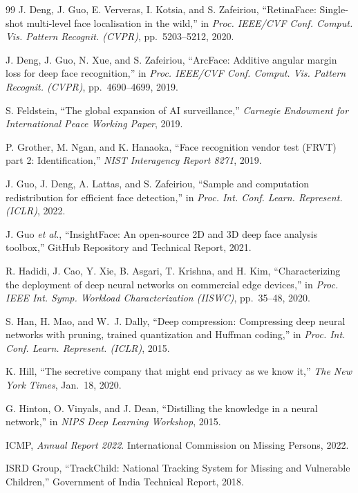 \documentclass[12pt, a4paper]{article}
\begin{document}
\begin{thebibliography}{99}
J. Deng, J. Guo, E. Ververas, I. Kotsia, and S. Zafeiriou, ``RetinaFace: Single-shot multi-level face localisation in the wild,'' in \textit{Proc. IEEE/CVF Conf. Comput. Vis. Pattern Recognit. (CVPR)}, pp.~5203--5212, 2020.

J. Deng, J. Guo, N. Xue, and S. Zafeiriou, ``ArcFace: Additive angular margin loss for deep face recognition,'' in \textit{Proc. IEEE/CVF Conf. Comput. Vis. Pattern Recognit. (CVPR)}, pp.~4690--4699, 2019.

S. Feldstein, ``The global expansion of AI surveillance,'' \textit{Carnegie Endowment for International Peace Working Paper}, 2019.

P. Grother, M. Ngan, and K. Hanaoka, ``Face recognition vendor test (FRVT) part 2: Identification,'' \textit{NIST Interagency Report 8271}, 2019.

J. Guo, J. Deng, A. Lattas, and S. Zafeiriou, ``Sample and computation redistribution for efficient face detection,'' in \textit{Proc. Int. Conf. Learn. Represent. (ICLR)}, 2022.

J. Guo \textit{et al.}, ``InsightFace: An open-source 2D and 3D deep face analysis toolbox,'' GitHub Repository and Technical Report, 2021.

R. Hadidi, J. Cao, Y. Xie, B. Asgari, T. Krishna, and H. Kim, ``Characterizing the deployment of deep neural networks on commercial edge devices,'' in \textit{Proc. IEEE Int. Symp. Workload Characterization (IISWC)}, pp.~35--48, 2020.

S. Han, H. Mao, and W.~J. Dally, ``Deep compression: Compressing deep neural networks with pruning, trained quantization and Huffman coding,'' in \textit{Proc. Int. Conf. Learn. Represent. (ICLR)}, 2015.

K. Hill, ``The secretive company that might end privacy as we know it,'' \textit{The New York Times}, Jan.~18, 2020.

G. Hinton, O. Vinyals, and J. Dean, ``Distilling the knowledge in a neural network,'' in \textit{NIPS Deep Learning Workshop}, 2015.

ICMP, \textit{Annual Report 2022}. International Commission on Missing Persons, 2022.

ISRD Group, ``TrackChild: National Tracking System for Missing and Vulnerable Children,'' Government of India Technical Report, 2018.


\end{thebibliography}
\end{document}
